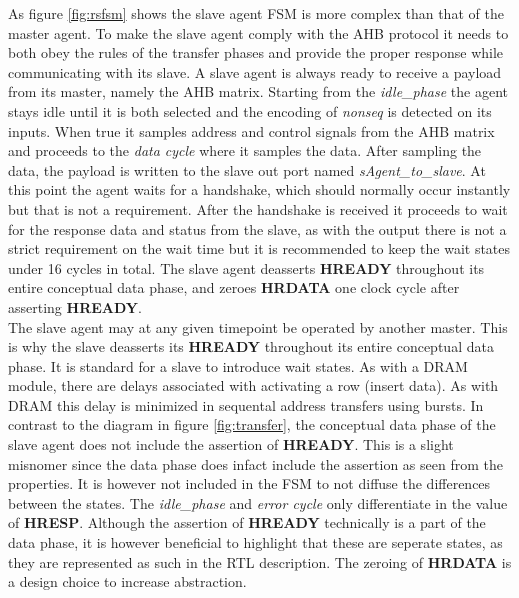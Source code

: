 As figure \ref{fig:rsfsm} shows the slave agent FSM is more complex than that of the master agent. To make the slave agent comply with the AHB protocol it needs to both obey the rules of the transfer phases and provide the proper response while communicating with its slave. A slave agent is always ready to receive a payload from its master, namely the AHB matrix. Starting from the \textit{idle\_phase} the agent stays idle until it is both selected and the encoding of \textit{nonseq} is detected on its inputs. When true it samples address and control signals from the AHB matrix and proceeds to the \textit{data cycle} where it samples the data. After sampling the data, the payload is written to the slave out port named \textit{sAgent\_to\_slave}. At this point the agent waits for a handshake, which should normally occur instantly but that is not a requirement. After the handshake is received it proceeds to wait for the response data and status from the slave, as with the output there is not a strict requirement on the wait time but it is recommended to keep the wait states under 16 cycles in total. The slave agent deasserts \textbf{HREADY} throughout its entire conceptual data phase, and zeroes \textbf{HRDATA} one clock cycle after asserting \textbf{HREADY}. \\
\newline
The slave agent may at any given timepoint be operated by another master. This is why the slave deasserts its \textbf{HREADY} throughout its entire conceptual data phase. It is standard for a slave to introduce wait states. As with a DRAM module, there are delays associated with activating a row (insert data). As with DRAM this delay is minimized in sequental address transfers using bursts. In contrast to the diagram in figure \ref{fig:transfer}, the conceptual data phase of the slave agent does not include the assertion of \textbf{HREADY}. This is a slight misnomer since the data phase does infact include the assertion as seen from the properties. It is however not included in the FSM to not diffuse the differences between the states. The \textit{idle\_phase} and \textit{error cycle} only differentiate in the value of \textbf{HRESP}. Although the assertion of \textbf{HREADY} technically is a part of the data phase, it is however beneficial to highlight that these are seperate states, as they are represented as such in the RTL description. The zeroing of \textbf{HRDATA} is a design choice to increase abstraction. 
\newpage

